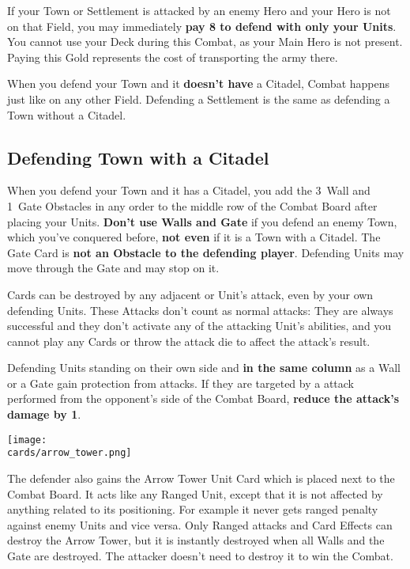 \begin{multicols*}{2}
If your Town or Settlement is attacked by an enemy Hero and your Hero is not on that Field, you may immediately \textbf{pay 8  to defend with only your Units}.
You cannot use your Deck during this Combat, as your Main Hero is not present.
Paying this Gold represents the cost of transporting the army there.

When you defend your Town and it \textbf{doesn't have} a Citadel, Combat happens just like on any other Field.
Defending a Settlement is the same as defending a Town without a Citadel.

\vspace{0.5em}
\par

\subsection*{Defending Town with a Citadel}
When you defend your Town and it has a Citadel, you add the 3~Wall and 1~Gate Obstacles in any order to the middle row of the Combat Board after placing your Units.
\textbf{Don't use Walls and Gate} if you defend an enemy Town, which you've conquered before, \textbf{not even} if it is a Town with a Citadel.
The Gate Card is \textbf{not an Obstacle to the defending player}.
Defending Units may move through the Gate and may stop on it.

 Cards can be destroyed by any adjacent  or  Unit's attack, even by your own defending Units.
These Attacks don't count as normal attacks: They are always successful and they don't activate any of the attacking Unit's  abilities, and you cannot play any Cards or throw the attack die to affect the attack's result.

Defending Units standing on their own side and \textbf{in the same column} as a Wall or a Gate gain protection from  attacks.
If they are targeted by a  attack performed from the opponent's side of the Combat Board, \textbf{reduce the attack's damage by 1}.

\begin{center}
  \texttt{[image: \\cards/arrow\_tower.png]}
\end{center}
The defender also gains the Arrow Tower Unit Card which is placed next to the Combat Board.
It acts like any Ranged  Unit, except that it is not affected by anything related to its positioning.
For example it never gets ranged penalty against enemy Units and vice versa.
Only Ranged attacks and Card Effects can destroy the Arrow Tower, but it is instantly destroyed when all Walls and the Gate are destroyed.
The attacker doesn't need to destroy it to win the Combat.


\end{multicols*}
